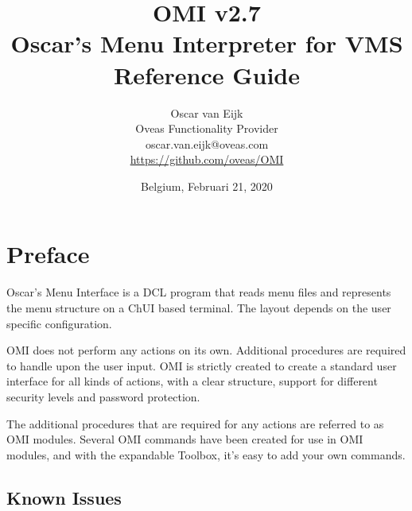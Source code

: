 \documentclass[a4paper]{book}
\newcommand{\vs}{\vspace{3mm}}
\begin{document}
\title{
OMI v2.7\\
Oscar's Menu Interpreter for VMS\\
Reference Guide}

\author{
Oscar van Eijk\\
Oveas Functionality Provider\\
oscar.van.eijk@oveas.com\\
\url{https://github.com/oveas/OMI}}

\date{Belgium, Februari 21, 2020}

\maketitle

\tableofcontents
\listoffigures
\listoftables

\setcounter{page}{1}
\chapter*{Preface}
\label{sec:introductione}

Oscar's Menu Interface is a DCL program that reads menu files and 
represents the menu structure on a ChUI based terminal. The layout depends 
on the user specific configuration.

\vs

OMI does not perform any actions on its own. Additional procedures are 
required to handle upon the user input. OMI is strictly created to create a 
standard user interface for all kinds of actions, with a clear structure, 
support for different security levels and password protection.

\vs

The additional procedures that are required for any actions are referred to 
as OMI modules. Several OMI commands have been created for use in OMI 
modules, and with the expandable Toolbox, it's easy to add your own 
commands.

\section*{Known Issues}
\label{subsec:known}
\end{document}
